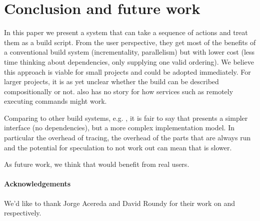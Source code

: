 \section{Conclusion and future work}
\label{sec:conclusion}

In this paper we present a system that can take a sequence of actions and treat them as a build script. From the user perspective, they get most of the benefits of a conventional build system (incrementality, parallelism) but with lower cost (less time thinking about dependencies, only supplying one valid ordering). We believe this approach is viable for small projects and could be adopted immediately. For larger projects, it is as yet unclear whether the build can be described compositionally or not. \Rattle also has no story for how services such as remotely executing commands might work.

Comparing \Rattle to other build systems, e.g. \Make, it is fair to say that \Rattle presents a simpler interface (no dependencies), but a more complex implementation model. In particular the overhead of tracing, the overhead of the parts that are always run and the potential for speculation to not work out can mean that \Rattle is slower.

As future work, we think that \Rattle would benefit from real users.

\paragraph{Acknowledgements} We'd like to thank Jorge Acereda and David Roundy for their work on \Fsatrace and \libbigbro respectively.
